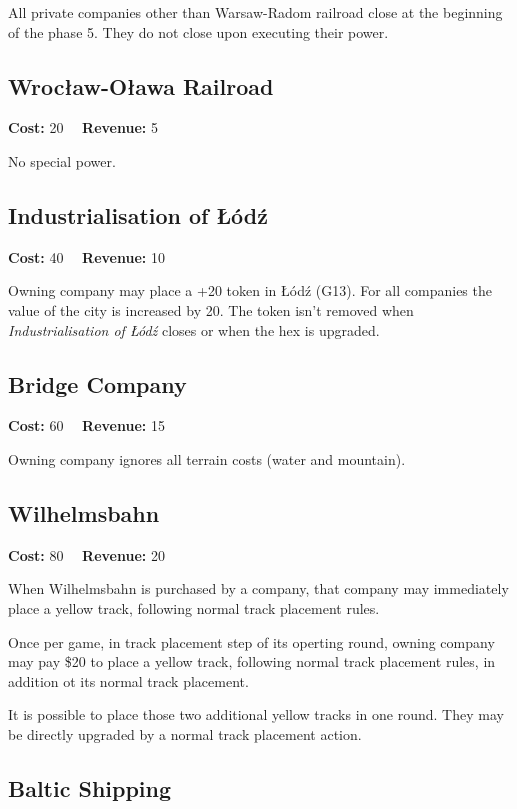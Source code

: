 \documentclass[10pt,a4paper,twocolumn]{article}
\begin{document}
All private companies other than Warsaw-Radom railroad close at the beginning of the phase 5. They do not close upon executing their power.

\subsection{Wrocław-Oława Railroad}

\textbf{Cost:} 20 ~~\textbf{Revenue:} 5

No special power.

\subsection{Industrialisation of Łódź}

\textbf{Cost:} 40 ~~\textbf{Revenue:} 10

Owning company may place a +20 token in Łódź (G13). For all companies the value of the city is increased by 20. The token isn't removed when \textit{Industrialisation of Łódź} closes or when the hex is upgraded. 

\subsection{Bridge Company}

\textbf{Cost:} 60 ~~\textbf{Revenue:} 15

Owning company ignores all terrain costs (water and mountain).

\subsection{Wilhelmsbahn}

\textbf{Cost:} 80 ~~\textbf{Revenue:} 20

When Wilhelmsbahn is purchased by a company, that company may immediately place a yellow track, following normal track placement rules.

Once per game, in track placement step of its operting round, owning company may pay \$20 to place a yellow track, following normal track placement rules, in addition ot its normal track placement. 

It is possible to place those two additional yellow tracks in one round. They may be directly upgraded by a normal track placement action.

\subsection{Baltic Shipping}
\end{document}
